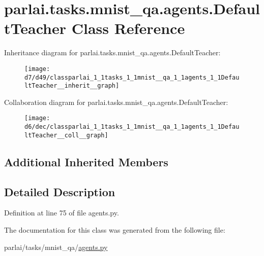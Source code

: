 \hypertarget{classparlai_1_1tasks_1_1mnist__qa_1_1agents_1_1DefaultTeacher}{}\section{parlai.\+tasks.\+mnist\+\_\+qa.\+agents.\+Default\+Teacher Class Reference}
\label{classparlai_1_1tasks_1_1mnist__qa_1_1agents_1_1DefaultTeacher}


Inheritance diagram for parlai.\+tasks.\+mnist\+\_\+qa.\+agents.\+Default\+Teacher\+:\nopagebreak
\begin{figure}[H]
\begin{center}
\leavevmode
\texttt{[image: d7/d49/classparlai\_1\_1tasks\_1\_1mnist\_\_qa\_1\_1agents\_1\_1DefaultTeacher\_\_inherit\_\_graph]}
\end{center}
\end{figure}


Collaboration diagram for parlai.\+tasks.\+mnist\+\_\+qa.\+agents.\+Default\+Teacher\+:\nopagebreak
\begin{figure}[H]
\begin{center}
\leavevmode
\texttt{[image: d6/dec/classparlai\_1\_1tasks\_1\_1mnist\_\_qa\_1\_1agents\_1\_1DefaultTeacher\_\_coll\_\_graph]}
\end{center}
\end{figure}
\subsection*{Additional Inherited Members}


\subsection{Detailed Description}


Definition at line 75 of file agents.\+py.



The documentation for this class was generated from the following file\+:\begin{DoxyCompactItemize}
\item 
parlai/tasks/mnist\+\_\+qa/\hyperlink{parlai_2tasks_2mnist__qa_2agents_8py}{agents.\+py}\end{DoxyCompactItemize}
